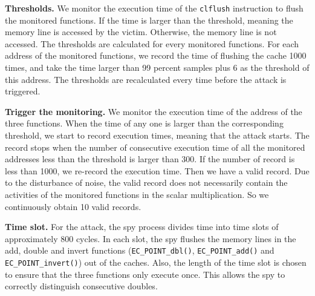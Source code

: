 
%
%
%



\noindent\textbf{Thresholds.}
We monitor the execution time of the \verb+clflush+ instruction to flush the monitored functions.
If the time is larger than the threshold, meaning the memory line is accessed by the victim.
Otherwise, the memory line is not accessed.
The thresholds are calculated for every monitored functions.
For each address of the monitored functions, we record the time of flushing the cache 1000 times, and take the time larger than 99 percent samples plus 6 as the threshold of this address.
The thresholds are recalculated every time before the attack is triggered.




\noindent\textbf{Trigger the monitoring.}
We monitor the execution time of the address of the three functions.
When the time of any one is larger than the corresponding threshold,
 we start to record execution times, meaning that the attack starts.
The record stops when the number of consecutive execution time of all the monitored addresses less than the threshold  is larger than 300.
If the number of record is less than 1000, we re-record the execution time.
Then we have a valid record.
 Due to the  disturbance of noise,
  the valid record does not necessarily contain the activities of the monitored functions in the scalar multiplication.
So we continuously obtain 10 valid records.


\noindent\textbf{Time slot.}
For the attack, the spy process divides time into time slots of approximately $800$ cycles.
In each slot, the spy flushes the memory lines in the add, double and invert functions (\verb+EC_POINT_dbl()+,  \verb+EC_POINT_add()+ and \verb+EC_POINT_invert()+) out of the caches.
Also, the length of the time slot is chosen to ensure that the three functions only execute once.
This allows the spy to correctly distinguish consecutive doubles.

